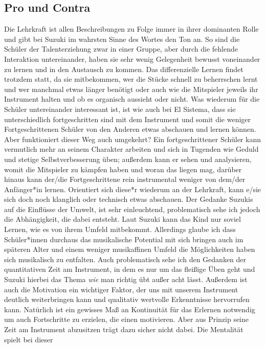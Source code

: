 \subsection{Pro und Contra}
Die Lehrkraft ist allen Beschreibungen zu Folge immer in ihrer dominanten Rolle
und gibt bei Suzuki im wahrsten Sinne des Wortes den Ton an. So sind die Schüler
der Talenterziehung zwar in einer Gruppe, aber durch die fehlende Interaktion
untereinander, haben sie sehr wenig Gelegenheit bewusst voneinander zu lernen
und in den Austausch zu kommen. Das differenzielle Lernen findet trotzdem statt,
da sie mitbekommen, wer die Stücke schnell zu beherrschen lernt und wer manchmal
etwas länger benötigt oder auch wie die Mitspieler jeweils ihr Instrument halten
und ob es organisch aussieht oder nicht. Was wiederum für die Schüler
untereinander interessant ist, ist wie auch bei El Sistema, dass sie
unterschiedlich fortgeschritten sind mit dem Instrument und somit die weniger
Fortgeschrittenen Schüler von den Anderen etwas abschauen und lernen können.
Aber funktioniert dieser Weg auch umgekehrt? Ein fortgeschrittener Schüler kann
vermutlich mehr an seinem Charakter arbeiten und sich in Tugenden wie Geduld und
stetige Selbstverbesserung üben; außerdem kann er sehen und analysieren, womit
die Mitspieler zu kämpfen haben und woran das liegen mag, darüber hinaus kann
der/die Fortgeschrittene rein instrumental weniger von dem/der Anfänger*in
lernen. Orientiert sich diese*r wiederum an der Lehrkraft, kann e/sie sich doch
noch klanglich oder technisch etwas abschauen. Der Gedanke Suzukis auf die
Einflüsse der Umwelt, ist sehr einleuchtend, problematisch sehe ich jedoch die
Abhängigkeit, die dabei entsteht. Laut Suzuki kann das Kind nur soviel Lernen,
wie es von ihrem Umfeld mitbekommt. Allerdings glaube ich dass Schüler*innen
durchaus das musikalische Potential mit sich bringen auch im späteren Alter und
einem weniger musikaffinen Umfeld die Möglichkeiten haben sich musikalisch zu
entfalten. Auch problematisch sehe ich den Gedanken der quantitativen Zeit am
Instrument, in dem es nur um das fleißige Üben geht und Suzuki hierbei das Thema
\emph{wie} man richtig übt außer acht lässt. Außerdem ist auch die Motivation
ein wichtiger Faktor, der uns mit unserem Instrument deutlich weiterbringen kann
und qualitativ wertvolle Erkenntnisse hervorrufen kann. Natürlich ist ein
gewisses Maß an Kontinuität für das Erlernen notwendig um auch Fortschritte zu
erzielen, die einen motivieren. Aber aus Prinzip seine Zeit am Instrument
abzusitzen trägt dazu sicher nicht dabei. Die Mentalität spielt bei dieser
